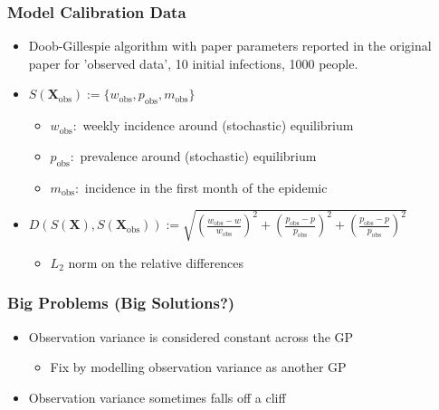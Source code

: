 \documentclass{beamer}
\begin{document}
\begin{frame}
    \frametitle{Model Calibration Data}\begin{itemize}
        \item Doob-Gillespie algorithm with paper parameters reported in the original paper for 'observed data', 10 initial infections, 1000 people.
        \item <2->$S(\mathbf{X}_\text{obs}) := \{w_\text{obs}, p_\text{obs}, m_\text{obs}\}$ \begin{itemize}
            \item $w_\text{obs}:$ weekly incidence around (stochastic) equilibrium
            \item $p_\text{obs}:$ prevalence around (stochastic) equilibrium
            \item $m_\text{obs}:$ incidence in the first month of the epidemic
        \end{itemize}
        \item <3-> $D(S(\mathbf{X}), S(\mathbf{X}_\text{obs})) := \sqrt{(\frac{w_\text{obs} - w}{w_\text{obs}})^2 + (\frac{p_\text{obs} - p}{p_\text{obs}})^2 + (\frac{p_\text{obs} - p}{p_\text{obs}})^2}$ \begin{itemize}
            \item $L_2$ norm on the relative differences
        \end{itemize}
    \end{itemize}



\end{frame}

\begin{frame}
    \frametitle{Big Problems (Big Solutions?)}
    \begin{itemize}
        \item Observation variance is considered constant across the GP\begin{itemize}
                  \item <2-> Fix by modelling observation variance as another GP
              \end{itemize}
        \item <3> Observation variance sometimes falls off a cliff
    \end{itemize}
\end{frame}
\end{document}
